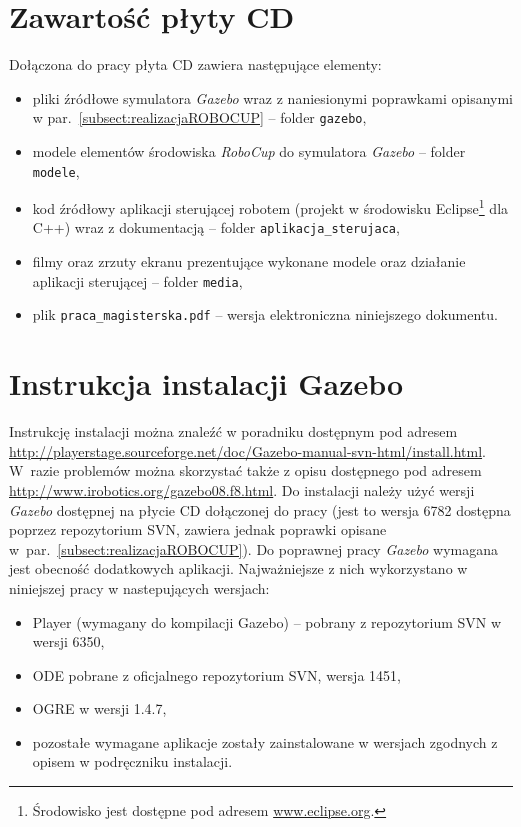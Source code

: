 \appendix
\chapter[Zawartość płyty CD ]{Zawartość płyty CD}
Dołączona do pracy płyta CD zawiera następujące elementy:
\begin{itemize}
\item pliki źródłowe symulatora \textit{Gazebo} wraz z naniesionymi poprawkami opisanymi w par.~\ref{subsect:realizacjaROBOCUP} -- folder \texttt{gazebo},
\item modele elementów środowiska \textit{RoboCup} do symulatora \textit{Gazebo} -- folder \texttt{modele},
\item kod źródłowy aplikacji sterującej robotem (projekt w środowisku \mbox{Eclipse}\footnote{Środowisko jest dostępne pod adresem \url{www.eclipse.org}.} dla C++) wraz z dokumentacją -- folder \texttt{aplikacja\_sterujaca},
\item filmy oraz zrzuty ekranu prezentujące wykonane modele oraz działanie aplikacji sterującej -- folder \texttt{media},
\item plik \texttt{praca\_magisterska.pdf} -- wersja elektroniczna niniejszego dokumentu.
\end{itemize}


\chapter[Instrukcja instalacji Gazebo]{Instrukcja instalacji Gazebo}
Instrukcję instalacji można znaleźć w poradniku dostępnym pod adresem \url{http://playerstage.sourceforge.net/doc/Gazebo-manual-svn-html/install.html}. \newline
W~razie problemów można skorzystać także z opisu dostępnego pod adresem \newline \url{http://www.irobotics.org/gazebo08.f8.html}. Do instalacji należy użyć wersji \textit{Gazebo} dostępnej na płycie CD dołączonej do pracy (jest to wersja 6782 dostępna poprzez repozytorium SVN, zawiera jednak poprawki opisane w~par.~\ref{subsect:realizacjaROBOCUP}). Do poprawnej pracy \textit{Gazebo} wymagana jest obecność dodatkowych aplikacji. Najważniejsze z nich wykorzystano w niniejszej pracy w nastepujących wersjach:
\begin{itemize}
 \item Player (wymagany do kompilacji Gazebo) -- pobrany z repozytorium SVN w wersji 6350,
 \item ODE pobrane z oficjalnego repozytorium SVN, wersja 1451,
 \item OGRE w wersji 1.4.7,
 \item pozostałe wymagane aplikacje zostały zainstalowane w wersjach zgodnych z opisem w podręczniku instalacji.
\end{itemize}


%

